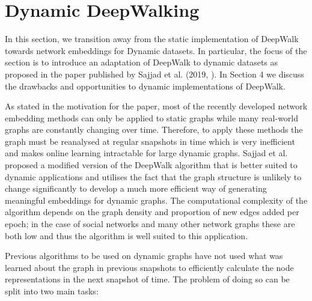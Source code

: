 \documentclass[a4paper]{article}
\begin{document}
\section{Dynamic DeepWalking}
In this section, we transition away from the static implementation of DeepWalk
towards network embeddings for Dynamic datasets. In particular, the focus of the
section is to introduce an adaptation of DeepWalk to dynamic datasets as
proposed in the paper published by Sajjad et al. (2019, \cite{sajjad2019}). In Section 4
we discuss the drawbacks and opportunities to dynamic implementations of DeepWalk.

As stated in the motivation for the paper, most of the recently developed
network embedding methods can only be applied to static graphs while many
real-world graphs are constantly changing over time. Therefore, to apply these
methods the graph must be reanalysed at regular snapshots in time which is very inefficient and makes
online learning intractable for large dynamic graphs. Sajjad et al. proposed a modified version of the DeepWalk
algorithm that is better suited to dynamic applications and utilises the fact that the
graph structure is unlikely to change significantly to develop a much more
efficient way of generating meaningful embeddings for dynamic graphs.
The computational complexity of the algorithm depends on the graph density and
proportion of new edges added per epoch; in the case of social networks and many other network graphs these
are both low and thus the algorithm is well suited to this application.

Previous algorithms to be used on dynamic graphs have not used what
was learned about the graph in previous snapshots to efficiently calculate the
node representations in the next snapshot of time. The problem of doing so can
be split into two main tasks:
\end{document}

